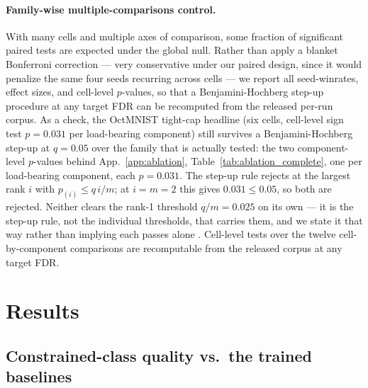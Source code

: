 \documentclass[10pt]{article}
\begin{document}
\paragraph{Family-wise multiple-comparisons control.}
With many cells and multiple axes of comparison, some fraction of significant
paired tests are expected under the global null. Rather than apply a blanket
Bonferroni correction --- very conservative under our paired design, since it
would penalize the same four seeds recurring across cells --- we report all
seed-winrates, effect sizes, and cell-level $p$-values, so that a
Benjamini-Hochberg step-up procedure at any target FDR can be recomputed from
the released per-run corpus. As a check, the OctMNIST tight-cap headline
(six cells, cell-level sign test $p\!=\!0.031$ per load-bearing component)
still survives a Benjamini-Hochberg step-up at $q\!=\!0.05$
%
{over the family that is actually tested: the two component-level
$p$-values behind {App.~\ref{app:ablation}, }Table~\ref{tab:ablation_complete}, one per load-bearing
component, each $p\!=\!0.031$. The step-up rule rejects at the largest rank $i$
with $p_{(i)}\!\le\!q\,i/m$; at $i\!=\!m\!=\!2$ this gives
$0.031\!\le\!0.05$, so both are rejected. Neither clears the rank-1 threshold
$q/m\!=\!0.025$ on its own --- it is the step-up rule, not the individual
thresholds, that carries them, and we state it that way rather than implying
each passes alone \citep{benjamini1995controlling}. Cell-level tests over the
twelve cell-by-component comparisons are recomputable from the released corpus
at any target FDR.}

\section{Results}
\label{sec:results}

\subsection{Constrained-class quality vs.\ the trained baselines}
\label{sec:oct}
\end{document}
